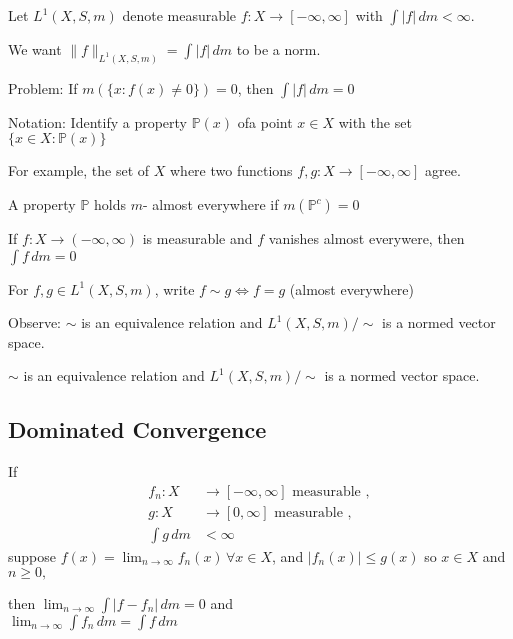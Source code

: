 Let $L^{1}(X,S, m)$ denote measurable $f: X \to [-\infty, \infty]$ with $\int | f| \, dm < \infty$.

We want $\|f\|_{L^{1}(X,S, m)} = \int |f| \, dm$ to be a norm.

Problem: If $m(\{x : f(x) \neq 0 \}) = 0$, then $\int |f| \, dm = 0$

\begin{remark}
	Notation: Identify a property $\mathbb{P}(x)$ ofa point $x \in X$ with the set $\{x \in X : \mathbb{P}(x)\}$
\end{remark}

For example, the set of $X$ where two functions  $f,g : X \to [-\infty, \infty]$ agree.

A property $\mathbb{P}$ holds $m$- almost everywhere if $m(\mathbb{P}^{c}) = 0$

\begin{example}
	If $f : X \to (-\infty, \infty)$ is measurable and $f$ vanishes almost everywere, then $\int f \, dm = 0$
\end{example}


For $f,g \in L^{1}(X,S, m)$, write $f \sim g \iff f=g$ (almost everywhere)

Observe: $\sim$ is an equivalence relation and $L^{1}(X,S, m) / \sim$ is a normed vector space.

\begin{observation}
  $\sim$ is an equivalence relation and $L^{1}(X,S, m) / \sim$ is a normed vector space.
\end{observation}

\subsection{Dominated Convergence}

\begin{definition}
	If
	\begin{align*}
		f_n : X &\to [-\infty, \infty] \text{ measurable }, \\
		g : X &\to [0, \infty] \text{ measurable }, \\
		\int g \, dm &< \infty
	\end{align*}
	suppose $f(x) = \lim_{n \to \infty} f_n(x)\, \forall x \in X$, and $|f_n (x) | \leq g(x)$ so
	$x \in X$ and $n \geq 0,$

	then  $\lim_{n\to \infty} \int | f - f_n | \, dm = 0$ and \\
	$\lim_{n\to \infty} \int f_n \, dm = \int f \, dm$

\end{definition}

